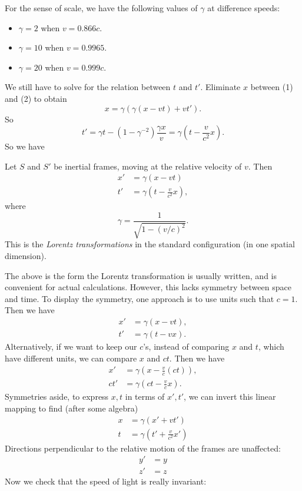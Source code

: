 \documentclass[a4paper]{article}
\begin{document}
For the sense of scale, we have the following values of $\gamma$ at difference speeds:
\begin{itemize}
  \item $\gamma = 2$ when $v = 0.866c$.
  \item $\gamma = 10$ when $v = 0.9965$.
  \item $\gamma = 20$ when $v = 0.999c$.
\end{itemize}

We still have to solve for the relation between $t$ and $t'$. Eliminate $x$ between (1) and (2) to obtain
\[
  x = \gamma(\gamma(x - vt) + vt').
\]
So
\[
  t' = \gamma t - (1 - \gamma^{-2})\frac{\gamma x}{v} = \gamma\left(t - \frac{v}{c^2}x\right).
\]
So we have
\begin{law}
  Let $S$ and $S'$ be inertial frames, moving at the relative velocity of $v$. Then
  \begin{align*}
    x' &= \gamma(x - vt)\\
    t' &= \gamma\left(t - \frac{v}{c^2}x\right),
  \end{align*}
  where
  \[
    \gamma = \frac{1}{\sqrt{1 - (v/c)^2}}.
  \]
  This is the \emph{Lorentz transformations} in the standard configuration (in one spatial dimension).
\end{law}
The above is the form the Lorentz transformation is usually written, and is convenient for actual calculations. However, this lacks symmetry between space and time. To display the symmetry, one approach is to use units such that $c = 1$. Then we have
\begin{align*}
  x' &= \gamma(x - vt),\\
  t' &= \gamma(t - vx).
\end{align*}
Alternatively, if we want to keep our $c$'s, instead of comparing $x$ and $t$, which have different units, we can compare $x$ and $ct$. Then we have
\begin{align*}
  x' &= \gamma\left(x - \frac{v}{c}(ct)\right),\\
  ct' &= \gamma\left(ct - \frac{v}{c}x\right).
\end{align*}
Symmetries aside, to express $x, t$ in terms of $x', t'$, we can invert this linear mapping to find (after some algebra)
\begin{align*}
  x &= \gamma(x' + vt')\\
  t &= \gamma\left(t' + \frac{v}{c^2}x'\right)
\end{align*}
Directions perpendicular to the relative motion of the frames are unaffected:
\begin{align*}
  y' &= y\\
  z' &= z
\end{align*}
Now we check that the speed of light is really invariant:
\end{document}
